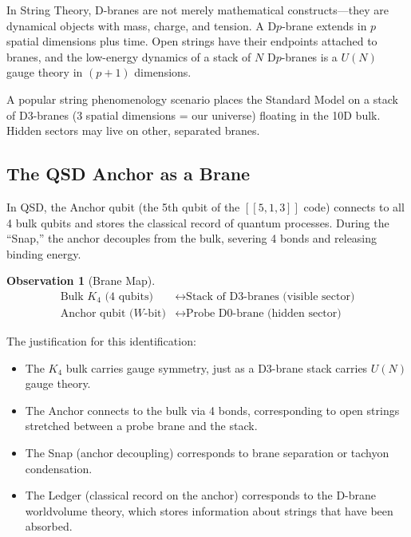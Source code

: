 \documentclass[11pt,a4paper]{article}
\theoremstyle{definition}
\newtheorem{observation}[theorem]{Observation}
\begin{document}
In String Theory, D-branes are not merely mathematical constructs---they
are dynamical objects with mass, charge, and tension.  A D$p$-brane
extends in $p$ spatial dimensions plus time.  Open strings have their
endpoints attached to branes, and the low-energy dynamics of a stack of
$N$ D$p$-branes is a $U(N)$ gauge theory in $(p+1)$ dimensions.

A popular string phenomenology scenario places the Standard Model on a
stack of D3-branes (3 spatial dimensions = our universe) floating in the
10D bulk.  Hidden sectors may live on other, separated branes.

\subsection{The QSD Anchor as a Brane}

In QSD, the Anchor qubit (the 5th qubit of the $[[5,1,3]]$ code) connects
to all 4 bulk qubits and stores the classical record of quantum
processes.  During the ``Snap,'' the anchor decouples from the bulk,
severing 4 bonds and releasing binding energy.

\begin{observation}[Brane Map]
\label{obs:brane}
\begin{align}
\text{Bulk } K_4 \text{ (4 qubits)} &\longleftrightarrow \text{Stack of D3-branes (visible sector)} \\
\text{Anchor qubit ($W$-bit)} &\longleftrightarrow \text{Probe D0-brane (hidden sector)}
\end{align}
\end{observation}

The justification for this identification:
\begin{itemize}[nosep]
    \item The $K_4$ bulk carries gauge symmetry, just as a D3-brane stack
          carries $U(N)$ gauge theory.
    \item The Anchor connects to the bulk via 4 bonds, corresponding to
          open strings stretched between a probe brane and the stack.
    \item The Snap (anchor decoupling) corresponds to brane separation or
          tachyon condensation.
    \item The Ledger (classical record on the anchor) corresponds to the
          D-brane worldvolume theory, which stores information about
          strings that have been absorbed.
\end{itemize}
\end{document}
